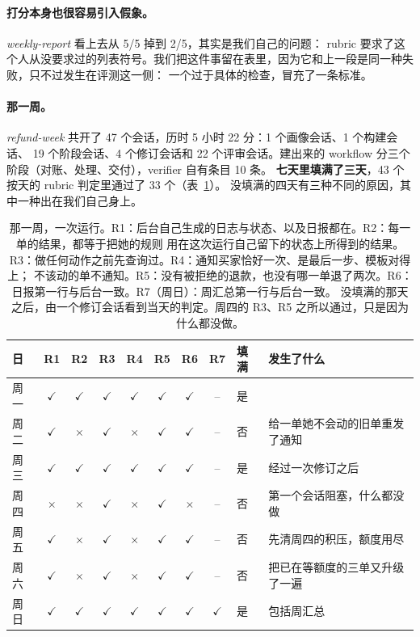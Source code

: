 \documentclass[10pt,UTF8,scheme=plain]{ctexart}
\newcommand{\rpass}{$\checkmark$}
\newcommand{\rfail}{$\times$}
\begin{document}
\paragraph{打分本身也很容易引入假象。} \emph{weekly-report} 看上去从 5/5 掉到 2/5，其实是我们自己的问题：
rubric 要求了这个人从没要求过的列表符号。我们把这件事留在表里，因为它和上一段是同一种失败，只不过发生在评测这一侧：
一个过于具体的检查，冒充了一条标准。

\paragraph{那一周。} \emph{refund-week} 共开了 47 个会话，历时 5 小时 22 分：1 个画像会话、1 个构建会话、
19 个阶段会话、4 个修订会话和 22 个评审会话。建出来的 workflow 分三个阶段（对账、处理、交付），verifier 自有条目 10 条。
\textbf{七天里填满了三天}，43 个按天的 rubric 判定里通过了 33 个（表~\ref{tab:week}）。
没填满的四天有三种不同的原因，其中一种出在我们自己身上。

\begin{table}[h]
\centering\footnotesize\setlength{\tabcolsep}{4pt}
\begin{tabular}{@{}lcccccccll@{}}
\toprule
日 & R1 & R2 & R3 & R4 & R5 & R6 & R7 & 填满 & 发生了什么 \\
\midrule
周一 & \rpass & \rpass & \rpass & \rpass & \rpass & \rpass & -- & 是 & \\
周二 & \rpass & \rfail & \rpass & \rfail & \rpass & \rpass & -- & 否 & 给一单她不会动的旧单重发了通知 \\
周三 & \rpass & \rpass & \rpass & \rpass & \rpass & \rpass & -- & 是 & 经过一次修订之后 \\
周四 & \rfail & \rfail & \rpass & \rfail & \rpass & \rfail & -- & 否 & 第一个会话阻塞，什么都没做 \\
周五 & \rpass & \rfail & \rpass & \rfail & \rpass & \rpass & -- & 否 & 先清周四的积压，额度用尽 \\
周六 & \rpass & \rfail & \rpass & \rfail & \rpass & \rpass & -- & 否 & 把已在等额度的三单又升级了一遍 \\
周日 & \rpass & \rpass & \rpass & \rpass & \rpass & \rpass & \rpass & 是 & 包括周汇总 \\
\bottomrule
\end{tabular}
\caption{那一周，一次运行。R1：后台自己生成的日志与状态、以及日报都在。R2：每一单的结果，都等于把她的规则
用在这次运行自己留下的状态上所得到的结果。R3：做任何动作之前先查询过。R4：通知买家恰好一次、是最后一步、模板对得上；
不该动的单不通知。R5：没有被拒绝的退款，也没有哪一单退了两次。R6：日报第一行与后台一致。R7（周日）：周汇总第一行与后台一致。
没填满的那天之后，由一个修订会话看到当天的判定。周四的 R3、R5 之所以通过，只是因为什么都没做。}
\label{tab:week}
\end{table}
\end{document}
